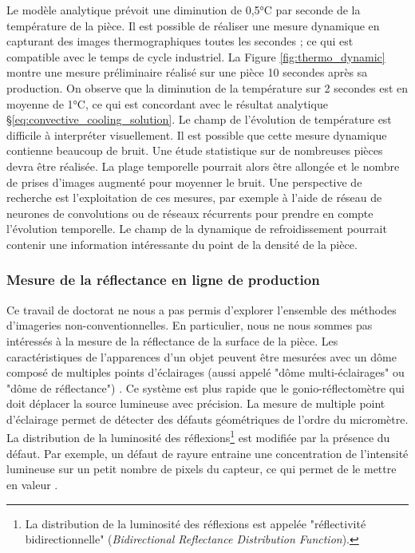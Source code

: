 Le modèle analytique prévoit une diminution de 0,5°C par seconde de la température de la pièce.
Il est possible de réaliser une mesure dynamique en capturant des images thermographiques toutes les secondes ; ce qui est compatible avec le temps de cycle industriel.
La Figure \ref{fig:thermo_dynamic} montre une mesure préliminaire réalisé sur une pièce 10 secondes après sa production.
On observe que la diminution de la température sur 2 secondes est en moyenne de 1°C, ce qui est concordant avec le résultat analytique §\ref{eq:convective_cooling_solution}.
Le champ de l'évolution de température est difficile à interpréter visuellement.
Il est possible que cette mesure dynamique contienne beaucoup de bruit.
Une étude statistique sur de nombreuses pièces devra être réalisée.
La plage temporelle pourrait alors être allongée et le nombre de prises d'images augmenté pour moyenner le bruit.
Une perspective de recherche est l'exploitation de ces mesures, par exemple à l'aide de réseau de neurones de convolutions ou de réseaux récurrents pour prendre en compte l'évolution temporelle.
Le champ de la dynamique de refroidissement pourrait contenir une information intéressante du point de la densité de la pièce.

\subsubsection{Mesure de la réflectance en ligne de production}
Ce travail de doctorat ne nous a pas permis d'explorer l'ensemble des méthodes d'imageries non-conventionnelles.
En particulier, nous ne nous sommes pas intéressés à la mesure de la réflectance de la surface de la pièce.
Les caractéristiques de l'apparences d'un objet peuvent être mesurées avec un dôme composé de multiples points d'éclairages (aussi appelé "dôme multi-éclairages" ou "dôme de réflectance") \cite{marschner_imagebased_2000, ghosh_brdf_2007}.
Ce système est plus rapide que le gonio-réflectomètre qui doit déplacer la source lumineuse avec précision.
La mesure de multiple point d'éclairage permet de détecter des défauts géométriques de l'ordre du micromètre.
La distribution de la luminosité des réflexions\footnote{La distribution de la luminosité des réflexions est appelée "réflectivité bidirectionnelle" (\textit{Bidirectional Reflectance Distribution Function}).} est modifiée par la présence du défaut.
Par exemple, un défaut de rayure entraine une concentration de l'intensité lumineuse sur un petit nombre de pixels du capteur, ce qui permet de le mettre en valeur \cite{desage_visual_2014}.

